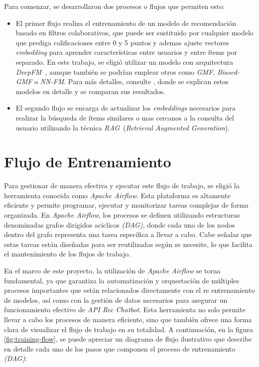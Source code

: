 \documentclass[11pt,a4paper,twoside]{thesis}
\begin{document}
Para comenzar, se desarrollaron dos procesos o flujos que permiten esto:
\begin{itemize}
	\item El primer flujo realiza el entrenamiento de un modelo de recomendación basado en filtros colaborativos, que puede ser sustituido por cualquier modelo que prediga calificaciones entre 0 y 5 puntos y ademas ajuste vectores \textit{embedding} para aprender características entre usuarios y entre ítems por separado. En este trabajo, se eligió utilizar un modelo con arquitectura \textit{DeepFM}~\cite{dfmpaper, didldfm}, aunque también se podrían emplear otros como \textit{GMF}, \textit{Biased-GMF} o \textit{NN-FM}. Para más detalles, consulte \cite{src}, donde se explican estos modelos en detalle y se comparan sus resultados.
	\item El segundo flujo se encarga de actualizar los \textit{embeddings} necesarios para realizar la búsqueda de ítems similares o mas cercanos a la consulta del usuario utilizando la técnica \textit{RAG}~\cite{rag}(\textit{Retrieval Augmented Generation}).
\end{itemize}


\section{Flujo de Entrenamiento}

Para gestionar de manera efectiva y ejecutar este flujo de trabajo, se eligió la herramienta conocida como \textit{Apache Airflow}. Esta plataforma es altamente eficiente y permite programar, ejecutar y monitorizar tareas complejas de forma organizada. En \textit{Apache Airflow}, los procesos se definen utilizando estructuras denominadas grafos dirigidos acíclicos \textit{(DAG)}, donde cada uno de los nodos dentro del grafo representa una tarea específica a llevar a cabo. Cabe señalar que estas tareas están diseñadas para ser reutilizadas según se necesite, lo que facilita el mantenimiento de los flujos de trabajo.

En el marco de este proyecto, la utilización de \textit{Apache Airflow} se torna fundamental, ya que garantiza la automatización y orquestación de múltiples procesos importantes que están relacionados directamente con el re entrenamiento de modelos, así como con la gestión de datos necesarios para asegurar un funcionamiento efectivo de \textit{API Rec Chatbot}. Esta herramienta no solo permite llevar a cabo los procesos de manera eficiente, sino que también ofrece una forma clara de visualizar el flujo de trabajo en su totalidad. A continuación, en la figura \ref{fig:training-flow}, se puede apreciar un diagrama de flujo ilustrativo que describe en detalle cada uno de los pasos que componen el proceso de entrenamiento \textit{(DAG)}:
\end{document}
